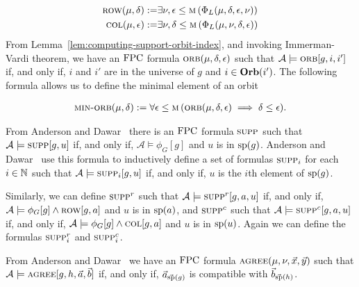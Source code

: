 \documentclass[../paper.tex]{subfiles}
\begin{document}
\begin{align*}
	\textsc{row} (\mu, \delta) :=   & \exists \nu, \epsilon \leq \textsc{m} \, (\Phi_L (\mu, \delta, \epsilon, \nu)) \\
	\textsc{col} (\mu, \epsilon) := & \exists \nu, \delta \leq \textsc{m} \, (\Phi_L (\mu, \nu, \delta , \epsilon))  
\end{align*}
From Lemma~\ref{lem:computing-support-orbit-index}, and invoking Immerman-Vardi
theorem, we have an $\text{\upshape FPC}$ formula $\textsc{orb}(\mu, \delta, \epsilon)$ such that
$\mathcal{A} \models \textsc{orb}[g,i, i']$ if, and only if, $i$ and $i'$ are in the
universe of $g$ and $i \in \text{\textbf{Orb}}(i')$. The following formula allows us to define
the minimal element of an orbit

\begin{align*}
	\textsc{min-orb} (\mu, \delta) := \forall \epsilon \leq \textsc{m} \, (\textsc{orb} (\mu, \delta, \epsilon) \implies \delta \leq \epsilon). 
\end{align*}


From Anderson and Dawar~\cite{AndersonD17} there is an $\text{\upshape FPC}$ formula
$\textsc{supp}$ such that $\mathcal{A} \models \textsc{supp} [g, u]$ if, and only if,
$\mathcal{A} \models \phi_G [g]$ and $u$ is in $\text{sp}(g)$. Anderson and
Dawar~\cite{AndersonD17} use this formula to inductively define a set of
formulas $\textsc{supp}_i$ for each $i \in \mathbb{N}$ such that $\mathcal{A} \models
\textsc{supp}_i[g, u]$ if, and only if, $u$ is the $i$th element of $\text{sp}(g)$.

Similarly, we can define $\textsc{supp}^r$ such that $\mathcal{A} \models
\textsc{supp}^r[g, a, u]$ if, and only if, $\mathcal{A} \models \phi_G [g] \land
\textsc{row}[g, a]$ and $u$ is in $\text{sp}(a)$, and $\textsc{supp}^c$ such that
$\mathcal{A} \models \textsc{supp}^c[g, a, u]$ if, and only if, $\mathcal{A} \models
\phi_G [g] \land \textsc{col}[g, a]$ and $u$ is in $\text{sp}(u)$. Again we can define
the formulas $\textsc{supp}^r_i$ and $\textsc{supp}^c_i$.

From Anderson and Dawar~\cite{AndersonD17} we have an $\text{\upshape FPC}$ formula
$\textsc{agree}(\mu, \nu, \vec{x}, \vec{y})$ such that $\mathcal{A} \models
\textsc{agree}[g, h, \vec{a}, \vec{b}]$ if, and only if, $\vec{a}_{\vec{\text{sp}}(g)}$
is compatible with $\vec{b}_{\vec{\text{sp}}(h)}$.
\end{document}
